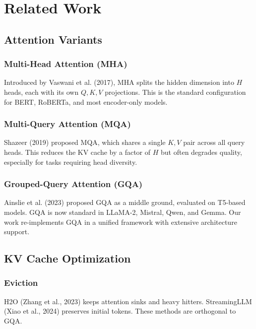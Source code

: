 
\section{Related Work}

\subsection{Attention Variants}

\subsubsection{Multi-Head Attention (MHA)}

Introduced by Vaswani et al. (2017), MHA splits the hidden dimension into 
$H$ heads, each with its own $Q, K, V$ projections. This is the standard 
configuration for BERT, RoBERTa, and most encoder-only models.

\subsubsection{Multi-Query Attention (MQA)}

Shazeer (2019) proposed MQA, which shares a single $K, V$ pair across all 
query heads. This reduces the KV cache by a factor of $H$ but often 
degrades quality, especially for tasks requiring head diversity.

\subsubsection{Grouped-Query Attention (GQA)}

Ainslie et al. (2023) proposed GQA as a middle ground, evaluated on 
T5-based models. GQA is now standard in LLaMA-2, Mistral, Qwen, and 
Gemma. Our work re-implements GQA in a unified framework with extensive 
architecture support.

\subsection{KV Cache Optimization}

\subsubsection{Eviction}

H2O (Zhang et al., 2023) keeps attention sinks and heavy hitters. 
StreamingLLM (Xiao et al., 2024) preserves initial tokens. These methods 
are orthogonal to GQA.

